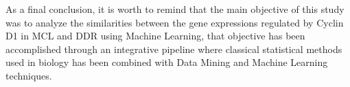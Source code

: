As a final conclusion, it is worth to remind that the main objective of this study was to analyze the similarities between the gene expressions regulated by Cyclin D1 in MCL and DDR using Machine Learning, that objective has been accomplished through an integrative pipeline where classical statistical methods used in biology has been combined with Data Mining and Machine Learning techniques.

